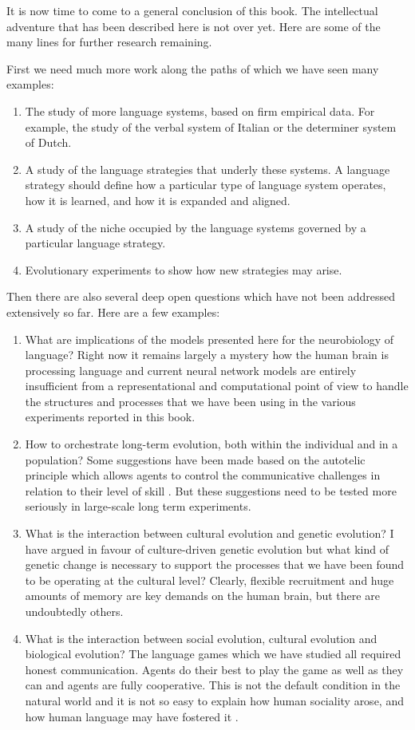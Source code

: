 It is now time to come to a general conclusion of this book. The intellectual adventure that has been described here 
is not over yet.  Here are some of the many lines for further research remaining. 

First we need much more work along the paths of which we have seen many examples: 
\begin{enumerate}
\item The study of more language systems, based on firm empirical data. For example, the study of the verbal system of 
Italian or the determiner system of Dutch. 
\item A study of the language strategies that underly these systems. A language strategy should define how a particular 
type of language system operates, how it is learned, and how it is expanded and aligned. 
\item A study of the niche occupied by the language systems governed by a particular language strategy. 
\item Evolutionary experiments to show how new strategies may arise. 
\end{enumerate} 
Then there are also several deep open questions which have not been addressed extensively so far. Here are a few examples: 
\begin{enumerate}
\item What are implications of the models presented here for the neurobiology of language? Right now it remains largely 
a mystery how the human brain is processing language and current neural network models are entirely insufficient from 
a representational and computational point of view to handle the structures and processes that we have been using in 
the various experiments reported in this book. 
\item How to orchestrate long-term evolution, both within the individual and in a population? Some suggestions have been 
made based on the autotelic principle which allows agents to control the communicative challenges in 
relation to their level of skill \citep{Steels:2007}. 
But these suggestions need to be tested
more seriously in large-scale long term experiments. 
\item What is the interaction between cultural evolution and genetic evolution? I have argued in favour of culture-driven genetic
evolution but what kind of genetic change is necessary to support the processes that we have been found to 
be operating at the cultural level? Clearly, flexible recruitment and huge amounts of memory are key demands on the 
human brain, but there are undoubtedly others. 
\item What is the interaction between social evolution, cultural evolution and biological evolution? The language 
games which we have studied all required honest communication. Agents do their best to play the game as well as they 
can and agents are fully cooperative. This is not the default condition in the natural world and it is not so easy 
to explain how human sociality arose, and how human language may have fostered it \citep{Dor:2014}. 
\end{enumerate}

